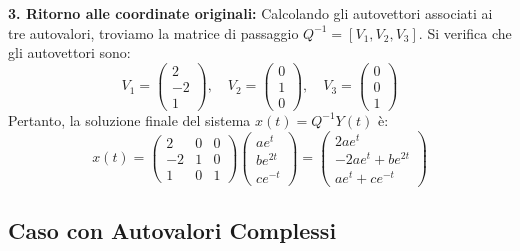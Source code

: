 \documentclass[openany]{book}
\theoremstyle{definition}
\theoremstyle{remark}
\begin{document}
\textbf{3. Ritorno alle coordinate originali:}
Calcolando gli autovettori associati ai tre autovalori, troviamo la matrice di passaggio $Q^{-1} = [V_1, V_2, V_3]$. Si verifica che gli autovettori sono:
\begin{equation}
    V_1 = \begin{pmatrix} 2 \\ -2 \\ 1 \end{pmatrix}, \quad 
    V_2 = \begin{pmatrix} 0 \\ 1 \\ 0 \end{pmatrix}, \quad 
    V_3 = \begin{pmatrix} 0 \\ 0 \\ 1 \end{pmatrix}
\end{equation}
Pertanto, la soluzione finale del sistema $x(t) = Q^{-1}Y(t)$ è:
\begin{equation}
    x(t) = 
    \begin{pmatrix} 
        2 & 0 & 0 \\ 
        -2 & 1 & 0 \\ 
        1 & 0 & 1 
    \end{pmatrix}
    \begin{pmatrix} a e^t \\ b e^{2t} \\ c e^{-t} \end{pmatrix}
    =
    \begin{pmatrix} 
        2a e^t \\ 
        -2a e^t + b e^{2t} \\ 
        a e^t + c e^{-t} 
    \end{pmatrix}
\end{equation}


\subsection{Caso con Autovalori Complessi}
\end{document}
